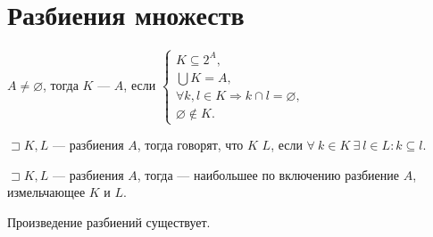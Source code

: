 \section{Разбиения множеств}\label{sec:ch-1-sec-2}


\begin{definition}[Разбиение мн-в]
    $A \neq \varnothing$, тогда $K$ ---  $A$, если
    $\begin{cases}
         K \subseteq 2^A,\\
         \bigcup K = A,\\
         \forall k, l \in K \Rightarrow k \cap l = \varnothing,\\
         \varnothing \notin K.
    \end{cases}$
\end{definition}

\begin{definition}
    $\sqsupset K, L$ --- разбиения $A$, тогда говорят, что $K$  $L$, если $\forall ~k \in K ~\exists ~l \in L: k \subseteq l$.
\end{definition}

\begin{definition}
    $\sqsupset K, L$ --- разбиения $A$, тогда  --- наибольшее по включению разбиение $A$, измельчающее $K$ и $L$.
\end{definition}

\begin{sh-proposition}
    Произведение разбиений существует.
\end{sh-proposition}

